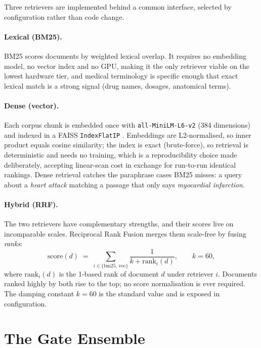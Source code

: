 Three retrievers are implemented behind a common interface, selected by
configuration rather than code change.

\paragraph{Lexical (BM25).} BM25 \citep{robertson2009bm25} scores documents
by weighted lexical overlap. It requires no embedding model, no vector index
and no GPU, making it the only retriever viable on the lowest hardware tier, and
medical terminology is specific enough that exact lexical match is a strong
signal (drug names, dosages, anatomical terms).

\paragraph{Dense (vector).} Each corpus chunk is embedded once with
\texttt{all-MiniLM-L6-v2} \citep{reimers2019} (384 dimensions) and indexed
in a FAISS \texttt{IndexFlatIP} \citep{johnson2019faiss}. Embeddings are
L2-normalised, so inner product equals cosine similarity; the index is exact
(brute-force), so retrieval is deterministic and needs no training, which is a
reproducibility choice made deliberately, accepting linear-scan cost in
exchange for run-to-run identical rankings. Dense retrieval catches the
paraphrase cases BM25 misses: a query about a \emph{heart attack} matching a
passage that only says \emph{myocardial infarction}.

\paragraph{Hybrid (RRF).} The two retrievers have complementary strengths,
and their scores live on incomparable scales. Reciprocal Rank Fusion merges
them scale-free by fusing \emph{ranks}:
\begin{equation}
  \mathrm{score}(d) \;=\; \sum_{i \in \{\text{bm25},\,\text{vec}\}}
  \frac{1}{k + \mathrm{rank}_i(d)}, \qquad k = 60,
  \label{eq:rrf}
\end{equation}
where $\mathrm{rank}_i(d)$ is the 1-based rank of document $d$ under
retriever $i$. Documents ranked highly by both rise to the top; no score
normalisation is ever required. The damping constant $k=60$ is the standard
value and is exposed in configuration.

\section{The Gate Ensemble}
\label{sec:method-gates}

